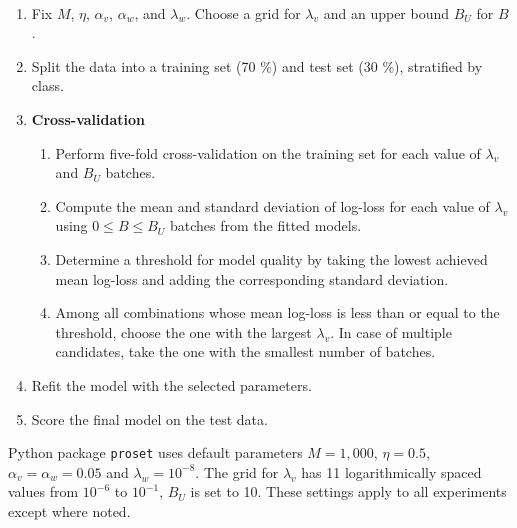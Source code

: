 \begin{algorithm}~
\label{alg_hyperparameters_updated}
%
\begin{enumerate}
\item Fix $M$, $\eta$, $\alpha_v$, $\alpha_w$, and $\lambda_w$.
Choose a grid for $\lambda_v$ and an upper bound $B_U$ for $B$.
%
\item Split the data into a training set (70 \%) and test set (30 \%), stratified by class.
%
\item\textbf{Cross-validation}
%
\begin{enumerate}
\item Perform five-fold cross-validation on the training set for each value of $\lambda_v$ and $B_U$ batches.
%
\item Compute the mean and standard deviation of log-loss for each value of $\lambda_v$ using $0\leq B\leq B_U$ batches from the fitted models.
%
\item Determine a threshold for model quality by taking the lowest achieved mean log-loss and adding the corresponding standard deviation.
%
\item Among all combinations whose mean log-loss is less than or equal to the threshold, choose the one with the largest $\lambda_v$.
In case of multiple candidates, take the one with the smallest number of batches.
\end{enumerate}
%
\item Refit the model with the selected parameters.
%
\item Score the final model on the test data.
\end{enumerate}
\end{algorithm}
%
Python package \texttt{proset} uses default parameters $M=1,000$, $\eta=0.5$, $\alpha_v=\alpha_w=0.05$ and $\lambda_w=10^{-8}$.
The grid for $\lambda_v$ has 11 logarithmically spaced values from $10^{-6}$ to $10^{-1}$, $B_U$ is set to 10.
These settings apply to all experiments except where noted.\par
%
